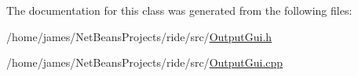 The documentation for this class was generated from the following files\-:\begin{DoxyCompactItemize}
\item 
/home/james/\-Net\-Beans\-Projects/ride/src/\hyperlink{_output_gui_8h}{Output\-Gui.\-h}\item 
/home/james/\-Net\-Beans\-Projects/ride/src/\hyperlink{_output_gui_8cpp}{Output\-Gui.\-cpp}\end{DoxyCompactItemize}
